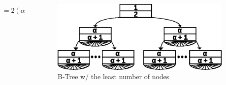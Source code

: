 \documentclass{beamer}
\begin{document}
\begin{frame}
\begin{columns}
\begin{column}{0.5\textwidth}
\begin{block}{}
\[\begin{aligned}
                        &= 2\left(\alpha + 1\right)^{h - 1} - 1
                    \end{aligned}
                \]
            \end{block}
        \end{column}
        \begin{column}{0.5\textwidth}
            \begin{figure}
                \includegraphics[width=0.95\linewidth,keepaspectratio]{resources/made/generic_min_btree.eps}
                \caption[]{B-Tree w/ the least number of nodes}
            \end{figure}
        \end{column}
    \end{columns}

    \framebreak


\end{frame}
\end{document}
